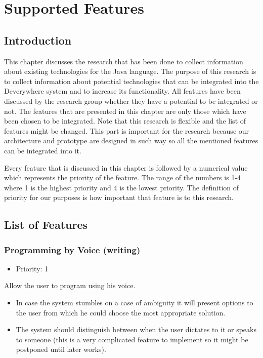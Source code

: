 \chapter{Supported Features} \label{chapter: Supported Features}
\section{Introduction}
This chapter discusses the research that has been done to collect information about existing technologies for the Java language. The purpose of this research is to collect information about potential technologies that can be integrated into the Deverywhere system and to increase its functionality. All features have been discussed by the research group whether they have a potential to be integrated or not. The features that are presented in this chapter are only those which have been chosen to be integrated. Note that this research is flexible and the list of features might be changed. This part is important for the research because our architecture and prototype are designed in such way so all the mentioned features can be integrated into it.

Every feature that is discussed in this chapter is followed by a numerical value which represents the priority of the feature. The range of the numbers is 1-4 where 1 is the highest priority and 4 is the lowest priority. The definition of priority for our purposes is how important that feature is to this research.

\section{List of Features}
\subsection{Programming by Voice (writing)}
\begin{itemize}
	\item Priority: 1
\end{itemize}
Allow the user to program using his voice.
\begin{itemize}
	\item In case the system stumbles on a case of ambiguity it will present options to the user from which he could choose the most appropriate solution.
	\item The system should distinguish between when the user dictates to it or speaks to someone (this is a very complicated feature to implement so it might be postponed until  later works).
\end{itemize}
